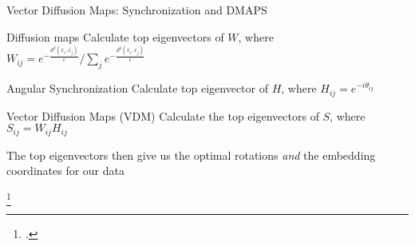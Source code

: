 \begin{frame}{Vector Diffusion Maps: Synchronization and DMAPS}
	
	\begin{minipage}{0.45\textwidth}
	\begin{block}{Diffusion maps}
		Calculate top eigenvectors of $W$, where $W_{ij} = e^{-\frac{d^2(x_i, x_j)}{\epsilon}} / \sum_j e^{-\frac{d^2(x_i, x_j)}{\epsilon}} $
	\end{block}
	\end{minipage}	
	\hfill
	\begin{minipage}{0.45\textwidth}	
	\begin{block}{Angular Synchronization}
		Calculate top eigenvector of $H$, where $H_{ij} = e^{-i \theta_{ij}}$
	\end{block}
	\end{minipage}
	
	\begin{block}{Vector Diffusion Maps (VDM) \footnotemark} 
		Calculate the top eigenvectors of $S$, where $S_{ij} = W_{ij}H_{ij}$
		
		The top eigenvectors then give us the optimal rotations {\em and} the embedding coordinates for our data
	\end{block}
	\footcitetext{singer2012vector}

	\vspace{-0.2in}
	

\end{frame}